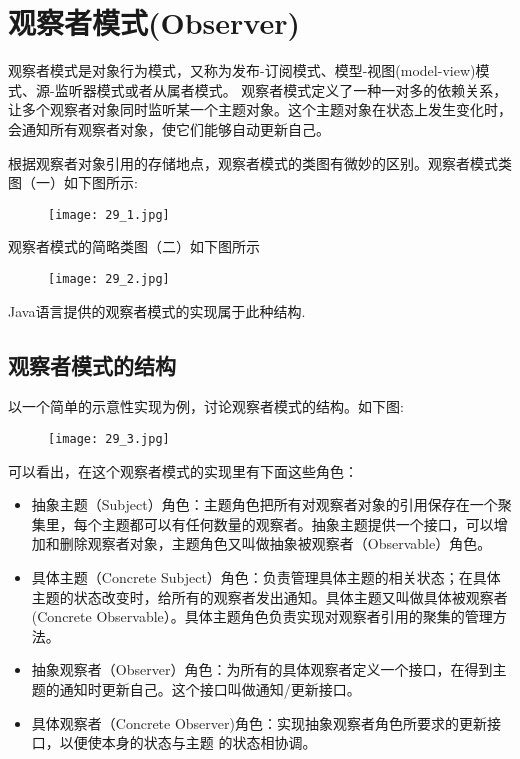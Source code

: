 \documentclass[../main.tex]{subfiles}
\begin{document}
\section{观察者模式(Observer)}
观察者模式是对象行为模式，又称为发布-订阅模式、模型-视图(model-view)模式、源-监听器模式或者从属者模式。
观察者模式定义了一种一对多的依赖关系，让多个观察者对象同时监听某一个主题对象。这个主题对象在状态上发生变化时，会通知所有观察者对象，使它们能够自动更新自己。

根据观察者对象引用的存储地点，观察者模式的类图有微妙的区别。观察者模式类图（一）如下图所示:
%
\begin{figure}[H]
  \texttt{[image: 29\_1.jpg]}
\end{figure}
%
观察者模式的简略类图（二）如下图所示
%
\begin{figure}[H]
  \texttt{[image: 29\_2.jpg]}
\end{figure}
%
Java语言提供的观察者模式的实现属于此种结构.
%
\subsection{观察者模式的结构}
以一个简单的示意性实现为例，讨论观察者模式的结构。如下图:
%
\begin{figure}[H]
  \texttt{[image: 29\_3.jpg]}
\end{figure}
%
可以看出，在这个观察者模式的实现里有下面这些角色：
\begin{itemize}
  \item 抽象主题（Subject）角色：主题角色把所有对观察者对象的引用保存在一个聚集里，每个主题都可以有任何数量的观察者。抽象主题提供一个接口，可以增加和删除观察者对象，主题角色又叫做抽象被观察者（Observable）角色。
  \item 具体主题（Concrete Subject）角色：负责管理具体主题的相关状态；在具体主题的状态改变时，给所有的观察者发出通知。具体主题又叫做具体被观察者(Concrete Observable）。具体主题角色负责实现对观察者引用的聚集的管理方法。
  \item 抽象观察者（Observer）角色：为所有的具体观察者定义一个接口，在得到主题的通知时更新自己。这个接口叫做通知/更新接口。
  \item 具体观察者（Concrete Observer)角色：实现抽象观察者角色所要求的更新接口，以便使本身的状态与主题 的状态相协调。
\end{itemize}
%




%
\end{document}
